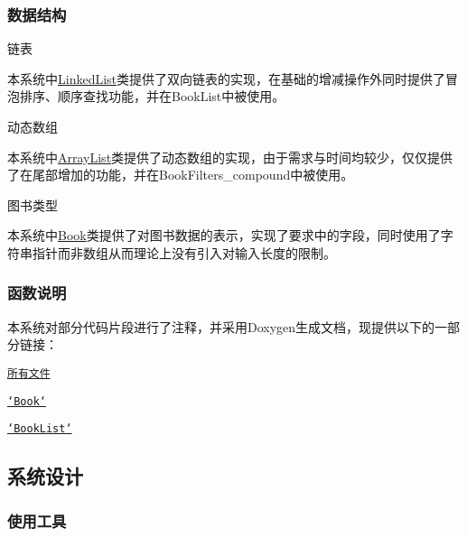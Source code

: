 \subsubsection*{数据结构}


\begin{DoxyEnumerate}
\item 链表

本系统中{\ttfamily \hyperlink{structLinkedList}{Linked\-List}}类提供了双向链表的实现，在基础的增减操作外同时提供了冒泡排序、顺序查找功能，并在{\ttfamily Book\-List}中被使用。
\item 动态数组

本系统中{\ttfamily \hyperlink{structArrayList}{Array\-List}}类提供了动态数组的实现，由于需求与时间均较少，仅仅提供了在尾部增加的功能，并在{\ttfamily Book\-Filters\-\_\-compound}中被使用。
\item 图书类型

本系统中{\ttfamily \hyperlink{structBook}{Book}}类提供了对图书数据的表示，实现了要求中的字段，同时使用了字符串指针而非数组从而理论上没有引入对输入长度的限制。
\end{DoxyEnumerate}

\subsubsection*{函数说明}

本系统对部分代码片段进行了注释，并采用{\ttfamily Doxygen}生成文档，现提供以下的一部分链接：


\begin{DoxyItemize}
\item \href{doxygen/html/files.html}{\tt 所有文件}
\item \href{doxygen/html/Book_8c.html}{\tt `\-Book`}
\item \href{doxygen/html/BookList_8c.html}{\tt `\-Book\-List`}
\end{DoxyItemize}

\subsection*{系统设计}

\subsubsection*{使用工具}


